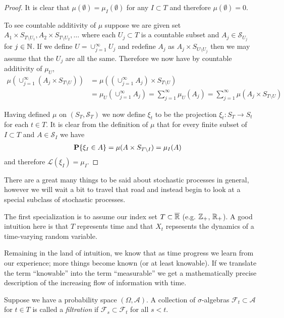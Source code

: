 \begin{proof}
It is clear that $\mu(\emptyset) = \mu_I(\emptyset)$ for any $I
\subset T$ and therefore $\mu(\emptyset) = 0$.  

To see countable additivity of $\mu$ suppose we are given set $A_1
\times S_{T \setminus U_1}, A_2 \times S_{T \setminus U_2}, \dotsc$
where each $U_j \subset T$ is a countable subset and $A_j \in
\mathcal{S}_{U_j}$ for $j \in \mathbb{N}$.  If we define $U =
\cup_{j=1}^\infty U_j$ and redefine $A_j$ as $A_j \times S_{U
  \setminus U_j}$ then we may assume that the $U_j$ are all the same.
  Therefore we now have by countable additivity of $\mu_U$,
\begin{align*}
\mu(\cup_{j=1}^\infty (A_j \times S_{T\setminus U})) &=
\mu((\cup_{j=1}^\infty A_j) \times S_{T\setminus U}) \\
&=\mu_U(\cup_{j=1}^\infty A_j) = \sum_{j=1}^\infty \mu_U(A_j) =
\sum_{j=1}^\infty \mu(A_j \times S_{T \setminus U}) 
\end{align*}

Having defined $\mu$ on $(S_T, \mathcal{S}_T)$ we now define $\xi_t$
to be the projection $\xi_t : S_T \to S_t$ for each $t \in T$.  It is
clear from the definition of $\mu$ that for every finite subset of $I
\subset T$ and $A \in \mathcal{S}_I$ we have
\begin{align*}
\textbf{P}\{ \xi_I \in A\} &= \mu(A \times S_{T \setminus I}) = \mu_I(A)
\end{align*}
and therefore $\mathcal{L}(\xi_I) = \mu_I$.
\end{proof}

There are a great many things to be said about stochastic processes in
general, however we will wait a bit to travel that road and instead begin to
look at a special subclass of stochastic processes.

The first specialization is to assume our index set $T \subset \overline{\mathbb{R}}$ (e.g. $\mathbb{Z}_+$,
$\mathbb{R}_+$).  A good intuition here is that $T$ represents time and that
$X_t$ repsesents the dynamics of a time-varying random variable.

Remaining in the land of intuition, we know that as time progress we
learn from our experience; more things become known (or at least
knowable).  If we translate the term ``knowable'' into the term
``measurable'' we get a mathematically precise description of the
increasing flow of information with time.
\begin{defn}Suppose we have a probability space $(\Omega,
  \mathcal{A})$.  A collection of $\sigma$-algebras $\mathcal{F}_t
  \subset \mathcal{A}$ for $t
  \in T$ is called a \emph{filtration} if $\mathcal{F}_s \subset
  \mathcal{F}_t$ for all $s < t$.
\end{defn}

